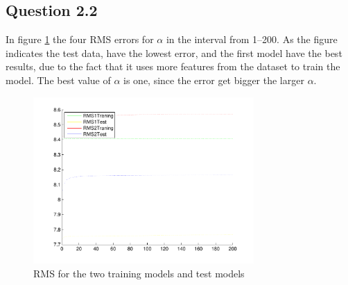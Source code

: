 \subsection*{Question 2.2}

In figure \ref{fig:q22} the four RMS errors for $\alpha$ in the
interval from 1--200. As the figure indicates the test data, have the
lowest error, and the first model have the best results, due to the
fact that it uses more features from the dataset to train the
model. The best value of $\alpha$ is one, since the error get bigger
the larger $\alpha$.

\begin{figure}[!htbp]
  \centering
  \includegraphics[width=0.75\textwidth]{./images/Q2.pdf}
  \caption{RMS for the two training models and test models}
  \label{fig:q22}
\end{figure}

\newpage
